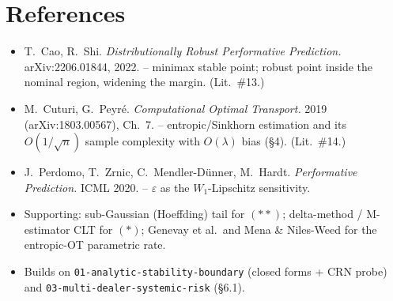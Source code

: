 \documentclass[11pt]{article}
\newcommand{\eps}{\varepsilon}
\newcommand{\code}[1]{\texttt{#1}}
\begin{document}
\section*{References}
\begin{itemize}[leftmargin=1.4em]
  \item T.\ Cao, R.\ Shi. \emph{Distributionally Robust Performative Prediction.}
  arXiv:2206.01844, 2022. -- minimax stable point; robust point inside the nominal
  region, widening the margin. (Lit.\ \#13.)
  \item M.\ Cuturi, G.\ Peyr\'e. \emph{Computational Optimal Transport.} 2019
  (arXiv:1803.00567), Ch.~7. -- entropic/Sinkhorn estimation and its $O(1/\sqrt{n})$
  sample complexity with $O(\lambda)$ bias (\S4). (Lit.\ \#14.)
  \item J.\ Perdomo, T.\ Zrnic, C.\ Mendler-D\"unner, M.\ Hardt. \emph{Performative
  Prediction.} ICML 2020. -- $\eps$ as the $W_1$-Lipschitz sensitivity.
  \item Supporting: sub-Gaussian (Hoeffding) tail for $(**)$; delta-method /
  M-estimator CLT for $(*)$; Genevay et al.\ and Mena \& Niles-Weed for the
  entropic-OT parametric rate.
  \item Builds on \code{01-analytic-stability-boundary} (closed forms + CRN probe)
  and \code{03-multi-dealer-systemic-risk} (\S6.1).
\end{itemize}
\end{document}
